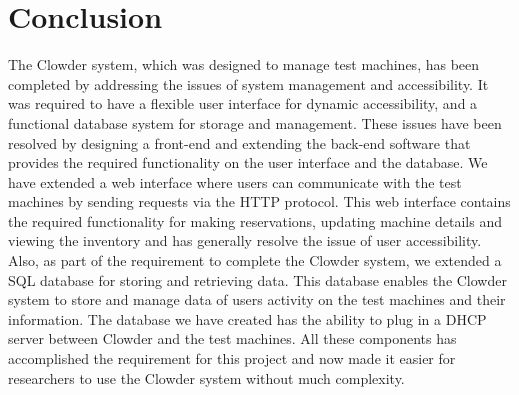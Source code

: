 \chapter{Conclusion}
\label{chap:conclusions}

The Clowder system, which was designed to manage test machines, has been completed by addressing the issues of system management and accessibility. It was required to have a flexible user interface for dynamic accessibility, and a functional database system for storage and management. These issues have been resolved by designing a front-end and extending the back-end  software that provides the required functionality on the user interface and the database. We have extended a web interface where users can communicate with the test machines by sending requests via the HTTP protocol. This web interface contains the required functionality for making reservations, updating machine details and viewing the inventory and has generally resolve the issue of user accessibility. Also, as part of the requirement to complete the Clowder system, we extended a SQL database for storing and retrieving data. This database enables the Clowder system to store and manage data of users  activity on the test machines and their information. The database we have created has the ability to plug in a DHCP server between Clowder and the test machines. All these components has accomplished the requirement for this project and now made it easier for researchers to use the Clowder system without much complexity. 
